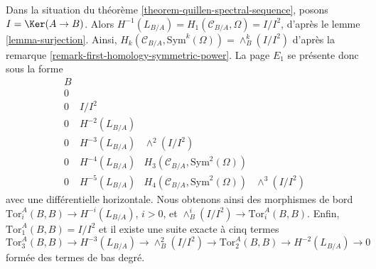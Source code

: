 \begin{remark}
\label{remark-elucidate-ss}
Dans la situation du théorème \ref{theorem-quillen-spectral-sequence}, posons
$I = \Ker(A \to B)$. Alors
$H^{-1}(L_{B/A}) = H_1(\mathcal{C}_{B/A}, \Omega) = I/I^2$, d'après le
lemme \ref{lemma-surjection}.
Ainsi,
$H_k(\mathcal{C}_{B/A}, \text{Sym}^k(\Omega)) = \wedge^k_B(I/I^2)$ d'après la
remarque \ref{remark-first-homology-symmetric-power}. La page $E_1$ se présente
donc sous la forme
$$
\begin{matrix}
B \\
0 \\
0 & I/I^2 \\
0 & H^{-2}(L_{B/A}) \\
0 & H^{-3}(L_{B/A}) & \wedge^2(I/I^2) \\
0 & H^{-4}(L_{B/A}) & H_3(\mathcal{C}_{B/A}, \text{Sym}^2(\Omega)) \\
0 & H^{-5}(L_{B/A}) & H_4(\mathcal{C}_{B/A}, \text{Sym}^2(\Omega)) &
\wedge^3(I/I^2)
\end{matrix}
$$
avec une différentielle horizontale. Nous obtenons ainsi des morphismes de bord
$\text{Tor}_i^A(B, B) \to H^{-i}(L_{B/A})$, $i > 0$, et
$\wedge^i_B(I/I^2) \to \text{Tor}_i^A(B, B)$. Enfin,
$\text{Tor}_1^A(B, B) = I/I^2$ et il existe une suite exacte à cinq termes
$$
\text{Tor}_3^A(B, B) \to H^{-3}(L_{B/A}) \to \wedge^2_B(I/I^2) \to
\text{Tor}_2^A(B, B) \to H^{-2}(L_{B/A}) \to 0
$$
formée des termes de bas degré.
\end{remark}

